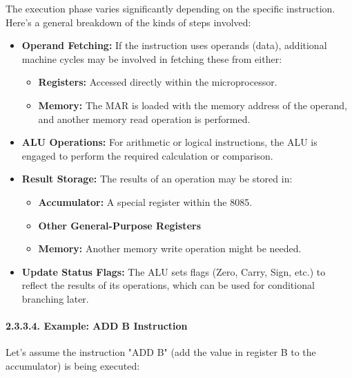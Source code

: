 \documentclass[
]{article}
\begin{document}
The execution phase varies significantly depending on the specific
instruction. Here's a general breakdown of the kinds of steps involved:

\begin{itemize}
\item
  \textbf{Operand Fetching:} If the instruction uses operands (data),
  additional machine cycles may be involved in fetching these from
  either:

  \begin{itemize}
  \item
    \textbf{Registers:} Accessed directly within the microprocessor.
  \item
    \textbf{Memory:} The MAR is loaded with the memory address of the
    operand, and another memory read operation is performed.
  \end{itemize}
\item
  \textbf{ALU Operations:} For arithmetic or logical instructions, the
  ALU is engaged to perform the required calculation or comparison.
\item
  \textbf{Result Storage:} The results of an operation may be stored in:

  \begin{itemize}
  \item
    \textbf{Accumulator:} A special register within the 8085.
  \item
    \textbf{Other General-Purpose Registers}
  \item
    \textbf{Memory:} Another memory write operation might be needed.
  \end{itemize}
\item
  \textbf{Update Status Flags:} The ALU sets flags (Zero, Carry, Sign,
  etc.) to reflect the results of its operations, which can be used for
  conditional branching later.
\end{itemize}

\hypertarget{2334-example-add-b-instruction}{%
\paragraph{2.3.3.4. Example: ADD B
Instruction}\label{2334-example-add-b-instruction}}

Let's assume the instruction "ADD B" (add the value in register B to the
accumulator) is being executed:
\end{document}
